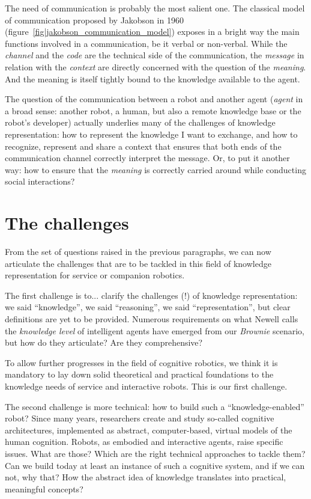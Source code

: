 The need of communication is probably the most salient one. The classical model
of communication proposed by Jakobson in 1960
(figure~\ref{fig|jakobson_communication_model}) exposes in a bright way the
main functions involved in a communication, be it verbal or non-verbal. While
the \emph{channel} and the \emph{code} are the technical side of the
communication, the \emph{message} in relation with the \emph{context} are
directly concerned with the question of the \emph{meaning}. And the meaning is
itself tightly bound to the knowledge available to the agent.

The question of the communication between a robot and another agent
(\emph{agent} in a broad sense: another robot, a human, but also a remote
knowledge base or the robot's developer) actually underlies many of the
challenges of knowledge representation: how to represent the knowledge I want
to exchange, and how to recognize, represent and share a context that ensures
that both ends of the communication channel correctly interpret the message.
Or, to put it another way: how to ensure that the \emph{meaning} is correctly
carried around while conducting social interactions?


\section{The challenges}
\label{sect|challenges}

From the set of questions raised in the previous paragraphs, we can now
articulate the challenges that are to be tackled in this field of knowledge
representation for service or companion robotics.

The first challenge is to... clarify the challenges (!) of knowledge
representation: we said ``knowledge'', we said ``reasoning'', we said
``representation'', but clear definitions are yet to be provided. Numerous
requirements on what Newell calls the \emph{knowledge level} of intelligent
agents have emerged from our \emph{Brownie} scenario, but how do they
articulate? Are they comprehensive?

To allow further progresses in the field of cognitive robotics, we think
it is mandatory to lay down solid theoretical and practical foundations to the
knowledge needs of service and interactive robots. This is our first challenge.

The second challenge is more technical: how to build such a
``knowledge-enabled'' robot? Since many years, researchers create and study
so-called cognitive architectures, implemented as abstract, computer-based,
virtual models of the human cognition. Robots, as embodied and interactive
agents, raise specific issues. What are those? Which are the right technical
approaches to tackle them? Can we build today at least an instance of such a
cognitive system, and if we can not, why that? How the abstract idea of
knowledge translates into practical, meaningful concepts?

